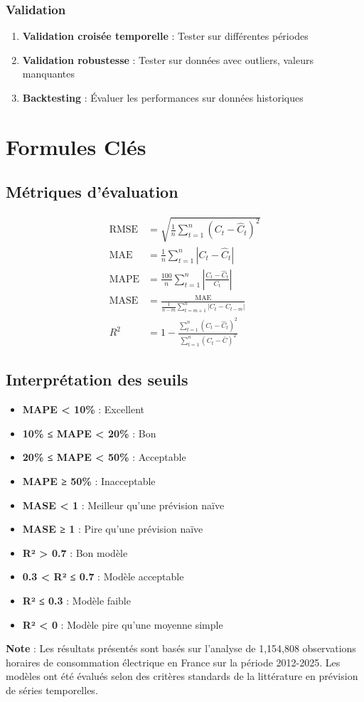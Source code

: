 \documentclass[12pt,a4paper]{article}
\begin{document}
\subsubsection{Validation}

\begin{enumerate}
    \item \textbf{Validation croisée temporelle} : Tester sur différentes périodes
    \item \textbf{Validation robustesse} : Tester sur données avec outliers, valeurs manquantes
    \item \textbf{Backtesting} : Évaluer les performances sur données historiques
\end{enumerate}

\section{Formules Clés}

\subsection{Métriques d'évaluation}

\begin{align}
    \text{RMSE} &= \sqrt{\frac{1}{n}\sum_{t=1}^{n}(C_t - \hat{C}_t)^2} \\
    \text{MAE} &= \frac{1}{n}\sum_{t=1}^{n}|C_t - \hat{C}_t| \\
    \text{MAPE} &= \frac{100}{n}\sum_{t=1}^{n}\left|\frac{C_t - \hat{C}_t}{C_t}\right| \\
    \text{MASE} &= \frac{\text{MAE}}{\frac{1}{n-m}\sum_{t=m+1}^{n}|C_t - C_{t-m}|} \\
    R^2 &= 1 - \frac{\sum_{t=1}^{n}(C_t - \hat{C}_t)^2}{\sum_{t=1}^{n}(C_t - \bar{C})^2}
\end{align}

\subsection{Interprétation des seuils}

\begin{itemize}
    \item \textbf{MAPE < 10\%} : Excellent
    \item \textbf{10\% ≤ MAPE < 20\%} : Bon
    \item \textbf{20\% ≤ MAPE < 50\%} : Acceptable
    \item \textbf{MAPE ≥ 50\%} : Inacceptable
    \item \textbf{MASE < 1} : Meilleur qu'une prévision naïve
    \item \textbf{MASE ≥ 1} : Pire qu'une prévision naïve
    \item \textbf{R² > 0.7} : Bon modèle
    \item \textbf{0.3 < R² ≤ 0.7} : Modèle acceptable
    \item \textbf{R² ≤ 0.3} : Modèle faible
    \item \textbf{R² < 0} : Modèle pire qu'une moyenne simple
\end{itemize}

\vspace{1cm}

\noindent\textbf{Note} : Les résultats présentés sont basés sur l'analyse de 1,154,808 observations horaires de consommation électrique en France sur la période 2012-2025. Les modèles ont été évalués selon des critères standards de la littérature en prévision de séries temporelles.
\end{document}
